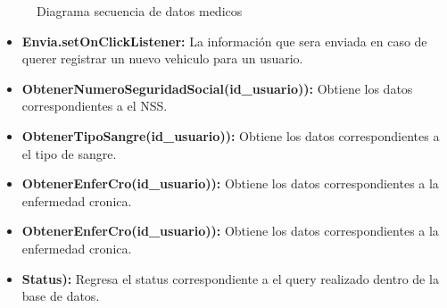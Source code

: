\begin{figure}[htbp!]
	\centering
	\caption{Diagrama secuencia de datos medicos}
	\label{fig:ObtenerDatosMedicos}
\end{figure}
\begin{itemize}
	\item \textbf{Envia.setOnClickListener:} La información que sera enviada en caso de querer registrar un nuevo vehiculo para un usuario.
	\item \textbf{ObtenerNumeroSeguridadSocial(id_usuario)):} Obtiene los datos correspondientes a el NSS.
	\item \textbf{ObtenerTipoSangre(id_usuario)):} Obtiene los datos correspondientes a el tipo de sangre.
	\item \textbf{ObtenerEnferCro(id_usuario)):} Obtiene los datos correspondientes a la enfermedad cronica.
	\item \textbf{ObtenerEnferCro(id_usuario)):} Obtiene los datos correspondientes a la enfermedad cronica.
	\item \textbf{Status):} Regresa el status correspondiente a el query realizado dentro de la base de datos.

	

\end{itemize}